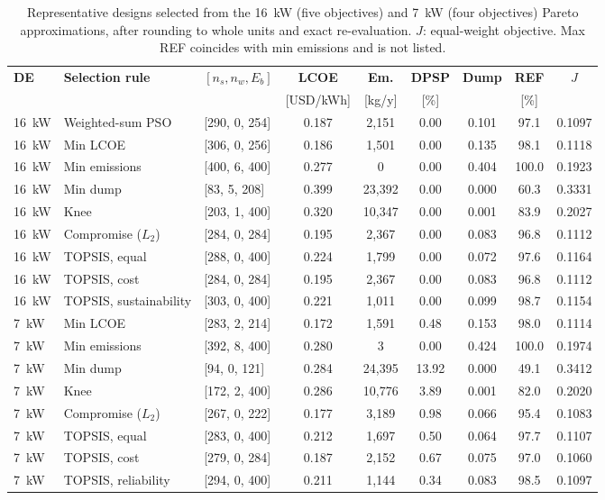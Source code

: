 \documentclass[final,3p,times]{elsarticle}
\begin{document}
\begin{table}[htbp]
\centering
\scriptsize
\setlength{\tabcolsep}{3pt}
\begin{tabular}{l l l c c c c c c}
\toprule
\textbf{DE} & \textbf{Selection rule} & \textbf{$[n_s, n_w, E_b]$} & \textbf{LCOE} & \textbf{Em.} & \textbf{DPSP} & \textbf{Dump} & \textbf{REF} & \textbf{$J$} \\
 & & & [USD/kWh] & [kg/y] & [\%] & & [\%] & \\
\midrule
16~kW & Weighted-sum PSO & [290, 0, 254] & 0.187 & 2,151 & 0.00 & 0.101 & 97.1 & 0.1097 \\
16~kW & Min LCOE & [306, 0, 256] & 0.186 & 1,501 & 0.00 & 0.135 & 98.1 & 0.1118 \\
16~kW & Min emissions & [400, 6, 400] & 0.277 & 0 & 0.00 & 0.404 & 100.0 & 0.1923 \\
16~kW & Min dump & [83, 5, 208] & 0.399 & 23,392 & 0.00 & 0.000 & 60.3 & 0.3331 \\
16~kW & Knee & [203, 1, 400] & 0.320 & 10,347 & 0.00 & 0.001 & 83.9 & 0.2027 \\
16~kW & Compromise ($L_2$) & [284, 0, 284] & 0.195 & 2,367 & 0.00 & 0.083 & 96.8 & 0.1112 \\
16~kW & TOPSIS, equal & [288, 0, 400] & 0.224 & 1,799 & 0.00 & 0.072 & 97.6 & 0.1164 \\
16~kW & TOPSIS, cost & [284, 0, 284] & 0.195 & 2,367 & 0.00 & 0.083 & 96.8 & 0.1112 \\
16~kW & TOPSIS, sustainability & [303, 0, 400] & 0.221 & 1,011 & 0.00 & 0.099 & 98.7 & 0.1154 \\
7~kW & Min LCOE & [283, 2, 214] & 0.172 & 1,591 & 0.48 & 0.153 & 98.0 & 0.1114 \\
7~kW & Min emissions & [392, 8, 400] & 0.280 & 3 & 0.00 & 0.424 & 100.0 & 0.1974 \\
7~kW & Min dump & [94, 0, 121] & 0.284 & 24,395 & 13.92 & 0.000 & 49.1 & 0.3412 \\
7~kW & Knee & [172, 2, 400] & 0.286 & 10,776 & 3.89 & 0.001 & 82.0 & 0.2020 \\
7~kW & Compromise ($L_2$) & [267, 0, 222] & 0.177 & 3,189 & 0.98 & 0.066 & 95.4 & 0.1083 \\
7~kW & TOPSIS, equal & [283, 0, 400] & 0.212 & 1,697 & 0.50 & 0.064 & 97.7 & 0.1107 \\
7~kW & TOPSIS, cost & [279, 0, 284] & 0.187 & 2,152 & 0.67 & 0.075 & 97.0 & 0.1060 \\
7~kW & TOPSIS, reliability & [294, 0, 400] & 0.211 & 1,144 & 0.34 & 0.083 & 98.5 & 0.1097 \\
\bottomrule
\end{tabular}
\caption{\label{tab:pareto_reps} Representative designs selected from the 16~kW (five objectives) and 7~kW (four objectives) Pareto approximations, after rounding to whole units and exact re-evaluation. $J$: equal-weight objective. Max REF coincides with min emissions and is not listed.}
\end{table}
\end{document}
